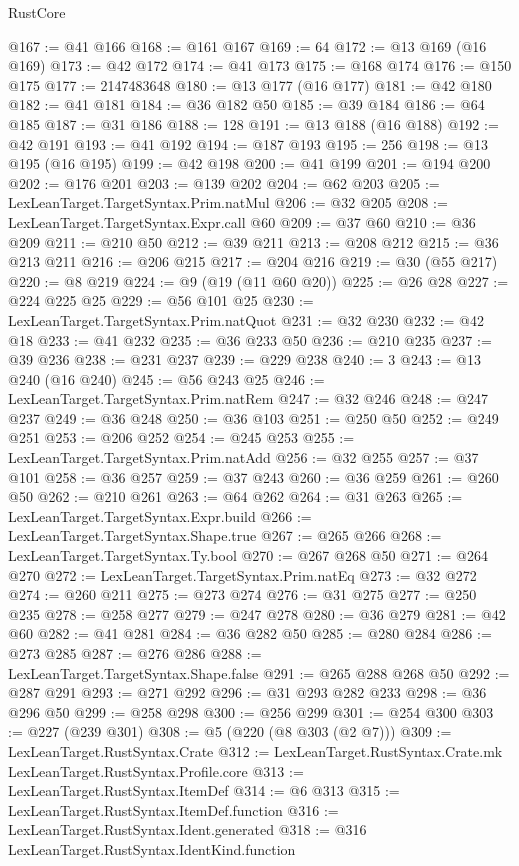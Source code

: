\begin{lexlean}{RustCore}
\begin{coremodule}
@167 := @41 @166
@168 := @161 @167
@169 := 64
@172 := @13 @169 (@16 @169)
@173 := @42 @172
@174 := @41 @173
@175 := @168 @174
@176 := @150 @175
@177 := 2147483648
@180 := @13 @177 (@16 @177)
@181 := @42 @180
@182 := @41 @181
@184 := @36 @182 @50
@185 := @39 @184
@186 := @64 @185
@187 := @31 @186
@188 := 128
@191 := @13 @188 (@16 @188)
@192 := @42 @191
@193 := @41 @192
@194 := @187 @193
@195 := 256
@198 := @13 @195 (@16 @195)
@199 := @42 @198
@200 := @41 @199
@201 := @194 @200
@202 := @176 @201
@203 := @139 @202
@204 := @62 @203
@205 := LexLeanTarget.TargetSyntax.Prim.natMul
@206 := @32 @205
@208 := LexLeanTarget.TargetSyntax.Expr.call @60
@209 := @37 @60
@210 := @36 @209
@211 := @210 @50
@212 := @39 @211
@213 := @208 @212
@215 := @36 @213 @211
@216 := @206 @215
@217 := @204 @216
@219 := @30 (@55 @217)
@220 := @8 @219
@224 := @9 (@19 (@11 @60 @20))
@225 := @26 @28
@227 := @224 @225 @25
@229 := @56 @101 @25
@230 := LexLeanTarget.TargetSyntax.Prim.natQuot
@231 := @32 @230
@232 := @42 @18
@233 := @41 @232
@235 := @36 @233 @50
@236 := @210 @235
@237 := @39 @236
@238 := @231 @237
@239 := @229 @238
@240 := 3
@243 := @13 @240 (@16 @240)
@245 := @56 @243 @25
@246 := LexLeanTarget.TargetSyntax.Prim.natRem
@247 := @32 @246
@248 := @247 @237
@249 := @36 @248
@250 := @36 @103
@251 := @250 @50
@252 := @249 @251
@253 := @206 @252
@254 := @245 @253
@255 := LexLeanTarget.TargetSyntax.Prim.natAdd
@256 := @32 @255
@257 := @37 @101
@258 := @36 @257
@259 := @37 @243
@260 := @36 @259
@261 := @260 @50
@262 := @210 @261
@263 := @64 @262
@264 := @31 @263
@265 := LexLeanTarget.TargetSyntax.Expr.build
@266 := LexLeanTarget.TargetSyntax.Shape.true
@267 := @265 @266
@268 := LexLeanTarget.TargetSyntax.Ty.bool
@270 := @267 @268 @50
@271 := @264 @270
@272 := LexLeanTarget.TargetSyntax.Prim.natEq
@273 := @32 @272
@274 := @260 @211
@275 := @273 @274
@276 := @31 @275
@277 := @250 @235
@278 := @258 @277
@279 := @247 @278
@280 := @36 @279
@281 := @42 @60
@282 := @41 @281
@284 := @36 @282 @50
@285 := @280 @284
@286 := @273 @285
@287 := @276 @286
@288 := LexLeanTarget.TargetSyntax.Shape.false
@291 := @265 @288 @268 @50
@292 := @287 @291
@293 := @271 @292
@296 := @31 @293 @282 @233
@298 := @36 @296 @50
@299 := @258 @298
@300 := @256 @299
@301 := @254 @300
@303 := @227 (@239 @301)
@308 := @5 (@220 (@8 @303 (@2 @7)))
@309 := LexLeanTarget.RustSyntax.Crate
@312 := LexLeanTarget.RustSyntax.Crate.mk LexLeanTarget.RustSyntax.Profile.core
@313 := LexLeanTarget.RustSyntax.ItemDef
@314 := @6 @313
@315 := LexLeanTarget.RustSyntax.ItemDef.function
@316 := LexLeanTarget.RustSyntax.Ident.generated
@318 := @316 LexLeanTarget.RustSyntax.IdentKind.function

\end{coremodule}
\end{lexlean}
